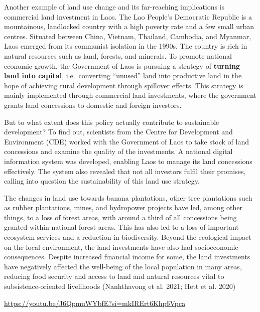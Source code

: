 \documentclass[
  a4paper,
  DIV=11,
  numbers=noendperiod,
  oneside,
  openany]{scrreprt}
\begin{document}
\begin{tcolorbox}[enhanced jigsaw, arc=.35mm, bottomrule=.15mm, bottomtitle=1mm, breakable, colback=white, colbacktitle=quarto-callout-tip-color!10!white, colframe=quarto-callout-tip-color-frame, coltitle=black, left=2mm, leftrule=.75mm, opacityback=0, opacitybacktitle=0.6, rightrule=.15mm, title={Example: Land investments in Laos}, titlerule=0mm, toprule=.15mm, toptitle=1mm]

Another example of land use change and its far-reaching implications is
commercial land investment in Laos. The Lao People's Democratic Republic
is a mountainous, landlocked country with a high poverty rate and a few
small urban centres. Situated between China, Vietnam, Thailand,
Cambodia, and Myanmar, Laos emerged from its communist isolation in the
1990s. The country is rich in natural resources such as land, forests,
and minerals. To promote national economic growth, the Government of
Laos is pursuing a strategy of \textbf{turning land into capital},
i.e.~converting ``unused'' land into productive land in the hope of
achieving rural development through spillover effects. This strategy is
mainly implemented through commercial land investments, where the
government grants land concessions to domestic and foreign investors.

But to what extent does this policy actually contribute to sustainable
development? To find out, scientists from the Centre for Development and
Environment (CDE) worked with the Government of Laos to take stock of
land concessions and examine the quality of the investments. A national
digital information system was developed, enabling Laos to manage its
land concessions effectively. The system also revealed that not all
investors fulfil their promises, calling into question the
sustainability of this land use strategy.

The changes in land use towards banana plantations, other tree
plantations such as rubber plantations, mines, and hydropower projects
have led, among other things, to a loss of forest areas, with around a
third of all concessions being granted within national forest areas.
This has also led to a loss of important ecosystem services and a
reduction in biodiversity. Beyond the ecological impact on the local
environment, the land investments have also had socioeconomic
consequences. Despite increased financial income for some, the land
investments have negatively affected the well-being of the local
population in many areas, reducing food security and access to land and
natural resources vital to subsistence-oriented livelihoods (Nanhthavong
et al. 2021; Hett et al. 2020)

\url{https://youtu.be/J6QpmuWYbfE?si=mkIRErt6Khp6Vpca}

\end{tcolorbox}
\end{document}

